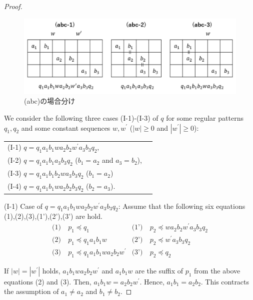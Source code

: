 \begin{proof}
\begin{figure}
\centering
\includegraphics[width=\linewidth]{figs/Cases-abc.png}
\vspace{-1cm}
\caption{(abc)の場合分け}
\label{abc組み合わせ}
\end{figure}

\noindent
We consider the following three cases (I-1)-(I-3) of $q$ for some regular patterns $q_{1},q_{2}$ and some constant sequences $w,w^{\prime}$ ($|w|\geq 0$ and $|w^{\prime}|\geq 0$):

\smallskip
\noindent
\begin{tabular}{ll}
(I-1) $q=q_{1}a_{1}b_{1}wa_{2}b_{2}w^{\prime}a_{3}b_{3}q_{2}$,\\
(I-2) $q=q_{1}a_{1}b_{1}a_{3}b_{3}q_{2}$ ($b_{1}=a_{2}$ and $a_{3}=b_{2}$),\\
(I-3) $q=q_{1}a_{1}b_{1}b_{2}wa_{3}b_{3}q_{2}$ ($b_{1}=a_{2}$)\\
(I-4) $q=q_{1}a_{1}b_{1}wa_{2}b_{2}b_{3}q_{2}$ ($b_{2}=a_{3}$).
\end{tabular}
\smallskip

\noindent
(I-1) Case of $q=q_{1}a_{1}b_{1}wa_{2}b_{2}w^{\prime}a_{3}b_{3}q_{2}$:
Assume that the following six equations (1),(2),(3),(1'),(2'),(3') are hold.
\begin{align*}
\textrm{(1)}~& p_{1} \preceq q_{1} & \textrm{(1')}~& p_{2} \preceq wa_{2}b_{2}w^{\prime}a_{3}b_{3}q_{2} \\
\textrm{(2)}~& p_{1} \preceq q_{1}a_{1}b_{1}w & \textrm{(2')}~& p_{2} \preceq w^{\prime}a_{3}b_{3}q_{2} \\
\textrm{(3)}~& p_{1} \preceq q_{1}a_{1}b_{1}wa_{2}b_{2}w^{\prime} & \textrm{(3')}~& p_{2} \preceq q_{2}
\end{align*}

If $|w|=|w^{\prime}|$ holds, $a_{1}b_{1}wa_{2}b_{2}w^{\prime}$ and $a_{1}b_{1}w$ are the suffix of $p_{1}$ from the above equations (2) and (3).
Then, $a_{1}b_{1}w=a_{2}b_{2}w^{\prime}$.
Hence, $a_{1}b_{1}=a_{2}b_{2}$.
This contracts the assumption of $a_{1} \ne a_{2}$ and $b_{1} \ne b_{2}$.


\end{proof}
